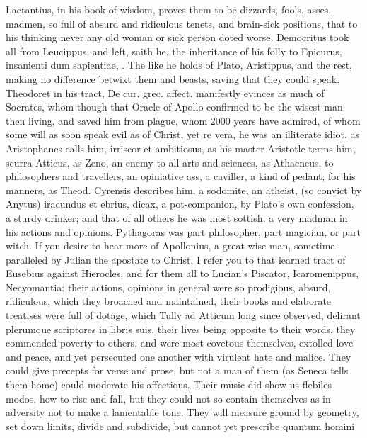 {Lactantius, in his book of wisdom, proves them to be dizzards,
fools, asses, madmen, so full of absurd and ridiculous tenets, and
brain-sick positions, that to his thinking never any old woman or sick
person doted worse. Democritus took all from Leucippus, and left,
saith he, the inheritance of his folly to Epicurus, insanienti dum
sapientiae, \etc. The like he holds of Plato, Aristippus, and the rest,
making no difference betwixt them and beasts, saving that they
could speak. Theodoret in his tract, De cur. grec. affect.
manifestly evinces as much of Socrates, whom though that Oracle of
Apollo confirmed to be the wisest man then living, and saved him from
plague, whom 2000 years have admired, of whom some will as soon speak
evil as of Christ, yet re vera, he was an illiterate idiot, as
Aristophanes calls him, irriscor et ambitiosus, as his master
Aristotle terms him, scurra Atticus, as Zeno, an enemy to all arts
and sciences, as Athaeneus, to philosophers and travellers, an
opiniative ass, a caviller, a kind of pedant; for his manners, as
Theod. Cyrensis describes him, a  sodomite, an atheist, (so
convict by Anytus) iracundus et ebrius, dicax, \etc a pot-companion, by
Plato's own confession, a sturdy drinker; and that of all others
he was most sottish, a very madman in his actions and opinions.
Pythagoras was part philosopher, part magician, or part witch. If you
desire to hear more of Apollonius, a great wise man, sometime
paralleled by Julian the apostate to Christ, I refer you to that
learned tract of Eusebius against Hierocles, and for them all to
Lucian's Piscator, Icaromenippus, Necyomantia: their actions, opinions
in general were so prodigious, absurd, ridiculous, which they broached
and maintained, their books and elaborate treatises were full of
dotage, which Tully ad Atticum long since observed, delirant plerumque
scriptores in libris suis, their lives being opposite to their words,
they commended poverty to others, and were most covetous themselves,
extolled love and peace, and yet persecuted one another with virulent
hate and malice. They could give precepts for verse and prose, but not
a man of them (as Seneca tells them home) could moderate his
affections. Their music did show us flebiles modos, \etc how to rise and
fall, but they could not so contain themselves as in adversity not to
make a lamentable tone. They will measure ground by geometry, set down
limits, divide and subdivide, but cannot yet prescribe quantum homini
}
